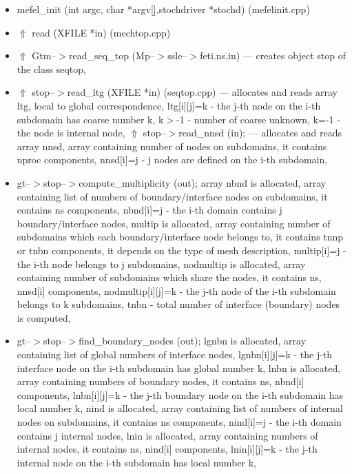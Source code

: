 \begin{itemize}
\item
mefel\_init (int argc, char *argv[],stochdriver *stochd) (mefelinit.cpp)

\item
$\Uparrow$ read (XFILE *in) (mechtop.cpp)

\item
$\Uparrow$ Gtm--$>$read\_seq\_top (Mp--$>$ssle--$>$feti.ns,in) --- creates object stop of the class seqtop,

\item
$\Uparrow$ stop--$>$read\_ltg (XFILE *in) (seqtop.cpp) --- allocates and reads array ltg,
local to global correspondence,
ltg[i][j]=k - the j-th node on the i-th subdomain has coarse number k,
k$>$-1 - number of coarse unknown,
k=-1 - the node is internal node,
\newline
$\Uparrow$ stop--$>$read\_nnsd (in); --- allocates and reads array nnsd,
array containing number of nodes on subdomains,
it contains nproc components,
nnsd[i]=j - j nodes are defined on the i-th subdomain,


\item 
gt--$>$stop--$>$compute\_multiplicity (out); 
\newline
array nbnd is allocated, 
array containing list of numbers of boundary/interface nodes on subdomains,
it contains ns components,
nbnd[i]=j - the i-th domain contains j boundary/interface nodes,
\newline
multip is allocated, 
array containing number of subdomains which each boundary/interface node belongs to,
it contains tnnp or tnbn components, it depends on the type of mesh description,
multip[i]=j - the i-th node belongs to j subdomains,
\newline
nodmultip is allocated,
array containing number of subdomains which share the nodes,
it contains ns, nnsd[i] components,
nodmultip[i][j]=k - the j-th node of the i-th subdomain belongs to k subdomains,
\newline
tnbn - total number of interface (boundary) nodes is computed, 


\item
gt--$>$stop--$>$find\_boundary\_nodes (out);
\newline
lgnbn is allocated, 
array containing list of global numbers of interface nodes,
lgnbn[i][j]=k - the j-th interface node on the i-th subdomain has global number k,
\newline
lnbn is allocated,
array containing numbers of boundary nodes,
it contains ns, nbnd[i] components,
lnbn[i][j]=k - the j-th boundary node on the i-th subdomain has local number k,
\newline
nind is allocated,
array containing list of numbers of internal nodes on subdomains,
it contains ns components,
nind[i]=j - the i-th domain contains j internal nodes,
\newline
lnin is allocated,
array containing numbers of internal nodes,
it contains ns, nind[i] components,
lnin[i][j]=k - the j-th internal node on the i-th subdomain has local number k,



\end{itemize}
